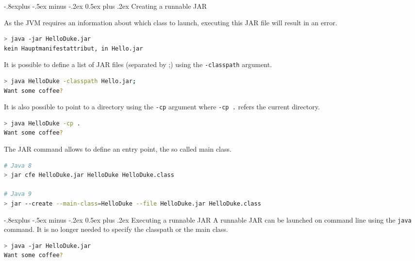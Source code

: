 \documentclass[10pt,landscape,a4paper]{article}
\makeatletter
\renewcommand{\subsection}{\@startsection{subsection}{2}{0mm}%
                                {-.8explus -.5ex minus -.2ex}%
                                {0.5ex plus .2ex}%
                                {\normalfont\normalsize\bfseries}}
\makeatother
\begin{document}
\begin{multicols}{2}
\subsection{Creating a runnable JAR}

As the JVM requires an information about which class to launch, executing this JAR file will result in an error.
\begin{lstlisting}[language=bash,frame=single]
> java -jar HelloDuke.jar
kein Hauptmanifestattribut, in Hello.jar
\end{lstlisting}
It is possible to define a list of JAR files (separated by ;) using the \texttt{-classpath} argument.
\begin{lstlisting}[language=bash,frame=single]
> java HelloDuke -classpath Hello.jar;
Want some coffee?

\end{lstlisting}
It is also possible to point to a directory using the  \texttt{-cp} argument where  \texttt{-cp .} refers the current directory.
\begin{lstlisting}[language=bash,frame=single]
> java HelloDuke -cp .
Want some coffee?

\end{lstlisting}
The JAR command allows to define an entry point, the so called main class. 
\begin{lstlisting}[language=bash,frame=single,breaklines=true]
# Java 8 
> jar cfe HelloDuke.jar HelloDuke HelloDuke.class

# Java 9 
> jar --create --main-class=HelloDuke --file HelloDuke.jar HelloDuke.class
\end{lstlisting}

\subsection{Executing a runnable JAR}
A runnable JAR can be launched on command line using the \texttt{java} command. It is no longer needed to specify the classpath or the main class.  
\begin{lstlisting}[language=bash,frame=single]
> java -jar HelloDuke.jar
Want some coffee?


\end{lstlisting}
\end{multicols}
\end{document}
